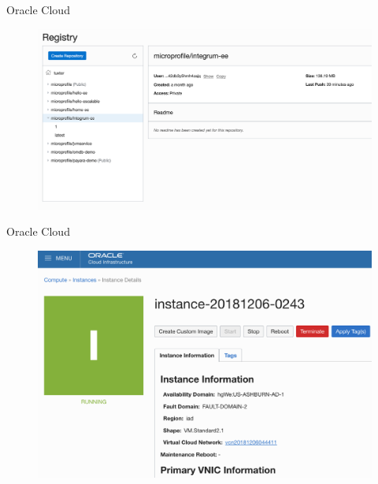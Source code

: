\documentclass[aspectratio=169]{beamer}
\begin{document}
\begin{frame}{Oracle Cloud}
\begin{figure}
	\centering
	\includegraphics[width=0.95\linewidth]{Images/oc1}
\end{figure}
\end{frame}

\begin{frame}{Oracle Cloud}
\begin{figure}
	\centering
	\includegraphics[width=0.95\linewidth]{Images/oc2}
\end{figure}
\end{frame}
\end{document}
